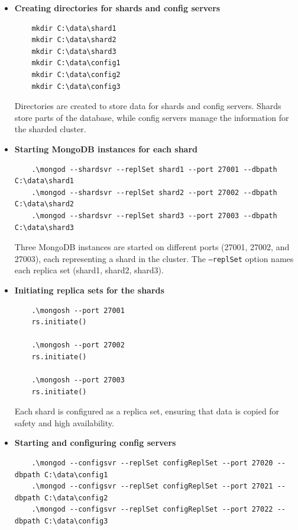 \documentclass[a4paper,12pt]{article}
\begin{document}
\begin{itemize}
    \item \textbf{Creating directories for shards and config servers}

    \begin{lstlisting}
    mkdir C:\data\shard1
    mkdir C:\data\shard2
    mkdir C:\data\shard3
    mkdir C:\data\config1
    mkdir C:\data\config2
    mkdir C:\data\config3
    \end{lstlisting}

    Directories are created to store data for shards and config servers. Shards store parts of the database, while config servers manage the information for the sharded cluster.

    \item \textbf{Starting MongoDB instances for each shard} 

    \begin{lstlisting}
    .\mongod --shardsvr --replSet shard1 --port 27001 --dbpath C:\data\shard1 
    .\mongod --shardsvr --replSet shard2 --port 27002 --dbpath C:\data\shard2 
    .\mongod --shardsvr --replSet shard3 --port 27003 --dbpath C:\data\shard3
    \end{lstlisting}

    Three MongoDB instances are started on different ports (27001, 27002, and 27003), each representing a shard in the cluster. The \texttt{--replSet} option names each replica set (shard1, shard2, shard3).


    \item \textbf{Initiating replica sets for the shards}

    \begin{lstlisting}
    .\mongosh --port 27001
    rs.initiate()

    .\mongosh --port 27002
    rs.initiate()

    .\mongosh --port 27003
    rs.initiate()
    \end{lstlisting}

    Each shard is configured as a replica set, ensuring that data is copied for safety and high availability.

    \item \textbf{Starting and configuring config servers}

    \begin{lstlisting}
    .\mongod --configsvr --replSet configReplSet --port 27020 --dbpath C:\data\config1 
    .\mongod --configsvr --replSet configReplSet --port 27021 --dbpath C:\data\config2
    .\mongod --configsvr --replSet configReplSet --port 27022 --dbpath C:\data\config3
    \end{lstlisting}


\end{itemize}
\end{document}
